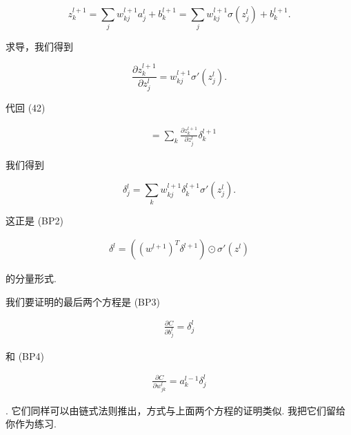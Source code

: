 \begin{equation}
z^{l+1}_k = \sum_j w^{l+1}_{kj} a^l_j +b^{l+1}_k = \sum_j w^{l+1}_{kj} \sigma(z^l_j) +b^{l+1}_k.
\tag{43}
\end{equation}

\noindent 求导，我们得到

\begin{equation}
\frac{\partial z^{l+1}_k}{\partial z^l_j} = w^{l+1}_{kj} \sigma'(z^l_j).
\tag{44}
\end{equation}

\noindent 代回 (42)

\begin{align*}
&= \sum_k \frac{\partial z^{l+1}_k}{\partial z^l_j} \delta^{l+1}_k \nonumber
\end{align*}

\noindent 我们得到

\begin{equation}
\delta^l_j = \sum_k w^{l+1}_{kj} \delta^{l+1}_k \sigma'(z^l_j).
\tag{45}
\end{equation}

\noindent 这正是 (BP2)

\begin{align*}
\delta^l = ((w^{l+1})^T \delta^{l+1}) \odot \sigma'(z^l) \nonumber
\end{align*}

\noindent 的分量形式.

我们要证明的最后两个方程是 (BP3)

\begin{align*}
\frac{\partial C}{\partial b^l_j} = \delta^l_j \nonumber
\end{align*}

\noindent 和 (BP4)

\begin{align*}
\frac{\partial C}{\partial w^l_{jk}} = a^{l-1}_k \delta^l_j \nonumber
\end{align*}

\noindent. 它们同样可以由链式法则推出，方式与上面两个方程的证明类似. 我把它们留给你作为练习.

